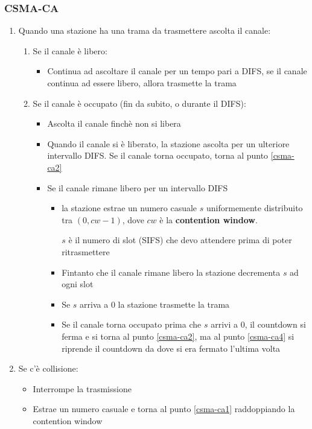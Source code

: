 \documentclass[a4paper]{article}
\begin{document}
\subsubsection{CSMA-CA}
\begin{enumerate}
  \item \label{csma-ca1} Quando una stazione ha una trama da trasmettere ascolta il canale:
    \begin{enumerate}
      \item Se il canale è libero:
        \begin{itemize}
          \item Continua ad ascoltare il canale per un tempo pari a DIFS,
            se il canale continua ad essere libero, allora trasmette la trama
        \end{itemize}

      \item \label{csma-ca2} Se il canale è occupato (fin da subito, o durante il DIFS):
        \begin{itemize}
          \item Ascolta il canale finchè non si libera
          \item Quando il canale si è liberato, la stazione ascolta per
            un ulteriore intervallo DIFS. Se il canale torna occupato,
            torna al punto \ref{csma-ca2}
          \item \label{csma-ca4} Se il canale rimane libero per un intervallo DIFS
            \begin{itemize}
              \item 
                la stazione
                estrae un numero casuale \( s \) uniformemente distribuito tra \( (0,cw-1) \),
                dove \( cw \) è la \textbf{contention window}.

                \( s \) è il numero di slot (SIFS) che devo attendere prima di poter
                ritrasmettere

              \item Fintanto che il canale rimane libero la stazione decrementa
                \( s \) ad ogni slot

              \item Se \( s \) arriva a 0 la stazione trasmette la trama
              \item Se il canale torna occupato prima che \( s \) arrivi a 0,
                il countdown si ferma e si torna al punto \ref{csma-ca2},
                ma al punto \ref{csma-ca4} si riprende il countdown da dove si era
                fermato l'ultima volta
            \end{itemize}
        \end{itemize}
    \end{enumerate}

  \item Se c'è collisione:
    \begin{itemize}
      \item Interrompe la trasmissione
      \item Estrae un numero casuale e torna al punto \ref{csma-ca1} raddoppiando
        la contention window
    \end{itemize}
\end{enumerate}
\end{document}
